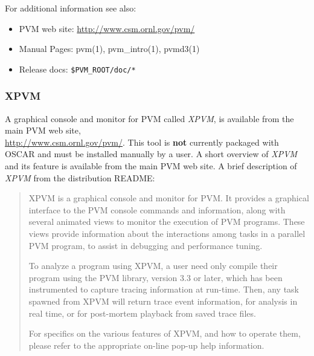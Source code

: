 \noindent For additional information see also:
\begin{itemize}
        \item PVM web site: \url{http://www.csm.ornl.gov/pvm/}
        \item Manual Pages: pvm(1), pvm\_intro(1), pvmd3(1)
        \item Release docs: \verb=$PVM_ROOT/doc/*=
\end{itemize}


\subsubsection{XPVM}

A graphical console and monitor for PVM called \emph{XPVM}, is available
from the main PVM web site, \\
\url{http://www.csm.ornl.gov/pvm/}.  
This tool is {\bf not} currently packaged with OSCAR and must be installed
manually by a user.  A short overview of \emph{XPVM} and its feature is
available from the main PVM web site.  A brief description of
\emph{XPVM} from the distribution README:
%
\begin{quote}

  XPVM is a graphical console and monitor for PVM. It provides a
  graphical interface to the PVM console commands and information, along
  with several animated views to monitor the execution of PVM programs.
  These views provide information about the interactions among tasks in a
  parallel PVM program, to assist in debugging and performance tuning.
  
  To analyze a program using XPVM, a user need only compile their
  program using the PVM library, version 3.3 or later, which has been
  instrumented to capture tracing information at run-time.  Then, any
  task spawned from XPVM will return trace event information, for
  analysis in real time, or for post-mortem playback from saved
  trace files.
  
  For specifics on the various features of XPVM, and how to operate
  them, please refer to the appropriate on-line pop-up help information.

\end{quote}

